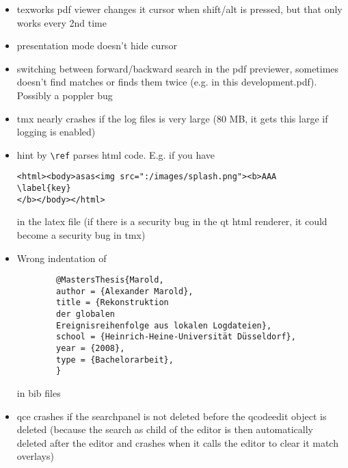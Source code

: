\documentclass[10pt,a4paper,landscape]{report}
\begin{document}
\begin{itemize}
\item texworks pdf viewer changes it cursor when shift/alt is pressed, but that only works every 2nd time
\item presentation mode doesn't hide cursor
\item switching between forward/backward search in the pdf previewer, sometimes doesn't find matches or finds them twice (e.g. in this development.pdf). Possibly a poppler bug
\item tmx nearly crashes if the log files is very large (80 MB, it gets this large if logging is enabled)
\item hint by \verb+\ref+ parses html code. E.g. if you have \begin{verbatim}
<html><body>asas<img src=":/images/splash.png"><b>AAA
\label{key}
</b></body></html>
\end{verbatim} in the latex file (if there is a security bug in the qt html renderer, it could become a security bug in tmx)
	\item Wrong indentation of \begin{verbatim}
		@MastersThesis{Marold,
		author = {Alexander Marold},
		title = {Rekonstruktion 
		der globalen 
		Ereignisreihenfolge aus lokalen Logdateien},
		school = {Heinrich-Heine-Universität Düsseldorf},
		year = {2008},
		type = {Bachelorarbeit},
		}
	\end{verbatim} in bib files
	\item  qce crashes if the searchpanel is not deleted before the qcodeedit object is deleted (because the search as child of the editor is then automatically deleted after the editor and crashes when it calls the editor to clear it match overlays)
\end{itemize} 
\end{document}
